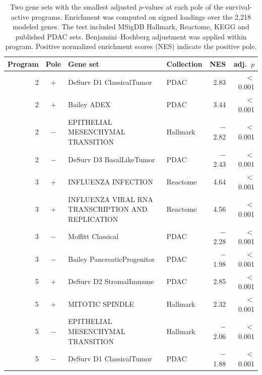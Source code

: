 \begin{table}[tbp]
\centering
\small
\caption{Two gene sets with the smallest adjusted $p$-values at each pole of the survival-active programs. Enrichment was computed on signed loadings over the 2,218 modeled genes. The test included MSigDB Hallmark, Reactome, KEGG and published PDAC sets. Benjamini--Hochberg adjustment was applied within program. Positive normalized enrichment scores (NES) indicate the positive pole.}
\label{tab:enrichment}
\begin{tabular}{@{}r c p{2.6in} l r r@{}}
\toprule
Program & Pole & Gene set & Collection & NES & adj.\ $p$ \\
\midrule
2 & $+$ & DeSurv D1 ClassicalTumor & PDAC & 2.83 & $<$0.001 \\
2 & $+$ & Bailey ADEX & PDAC & 3.44 & $<$0.001 \\
2 & $-$ & EPITHELIAL MESENCHYMAL TRANSITION & Hallmark & $-$2.82 & $<$0.001 \\
2 & $-$ & DeSurv D3 BasalLikeTumor & PDAC & $-$2.43 & $<$0.001 \\
3 & $+$ & INFLUENZA INFECTION & Reactome & 4.64 & $<$0.001 \\
3 & $+$ & INFLUENZA VIRAL RNA TRANSCRIPTION AND REPLICATION & Reactome & 4.56 & $<$0.001 \\
3 & $-$ & Moffitt Classical & PDAC & $-$2.28 & $<$0.001 \\
3 & $-$ & Bailey PancreaticProgenitor & PDAC & $-$1.98 & $<$0.001 \\
5 & $+$ & DeSurv D2 StromalImmune & PDAC & 2.85 & $<$0.001 \\
5 & $+$ & MITOTIC SPINDLE & Hallmark & 2.32 & $<$0.001 \\
5 & $-$ & EPITHELIAL MESENCHYMAL TRANSITION & Hallmark & $-$2.06 & $<$0.001 \\
5 & $-$ & DeSurv D1 ClassicalTumor & PDAC & $-$1.88 & $<$0.001 \\
\bottomrule
\end{tabular}
\end{table}
